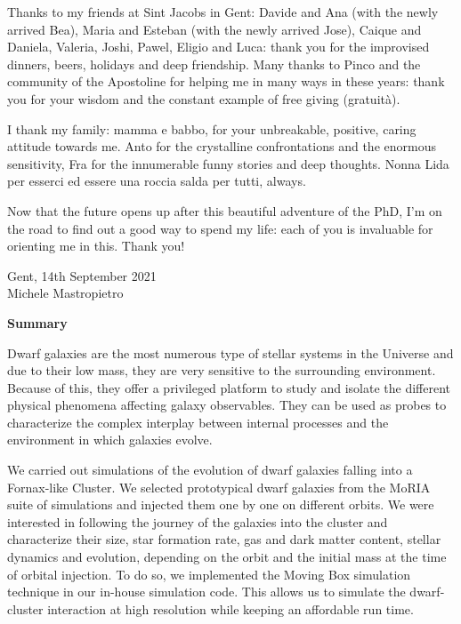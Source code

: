 Thanks to my friends at Sint Jacobs in Gent: Davide and Ana (with the newly arrived Bea), Maria and Esteban (with the newly arrived Jose), Caique and Daniela, Valeria, Joshi, Pawel, Eligio and Luca: thank you for the improvised dinners, beers, holidays and deep friendship.
Many thanks to Pinco and the community of the Apostoline for helping me in many ways in these years: thank you for your wisdom and the constant example of free giving (gratuità).

I thank my family: mamma e babbo, for your unbreakable, positive, caring attitude towards me.
Anto for the crystalline confrontations and the enormous sensitivity, Fra for the innumerable funny stories and deep thoughts. Nonna Lida per esserci ed essere una roccia salda per tutti, always.

Now that the future opens up after this beautiful adventure of the PhD, I'm on the road to find out a good way to spend my life: each of you is invaluable for orienting me in this. Thank you!

\begin{flushright}
  Gent, 14th September 2021\\Michele Mastropietro
\end{flushright}

\clearpage
\thispagestyle{empty}
\null%
\label{thesis:Summary}
\begin{center}
  {\Large \textbf{Summary}}\\
\end{center}

Dwarf galaxies are the most numerous type of stellar systems in the Universe and due to their low mass, they are very sensitive to the surrounding environment.
Because of this, they offer a privileged platform to study and isolate the different physical phenomena affecting galaxy observables.
They can be used as probes to characterize the complex interplay between internal processes and the environment in which galaxies evolve.

We carried out simulations of the evolution of dwarf galaxies falling into a Fornax-like Cluster.
We selected prototypical dwarf galaxies from the MoRIA suite of simulations and injected them one by one on different orbits.
We were interested in following the journey of the galaxies into the cluster and characterize their size, star formation rate, gas and dark matter content, stellar dynamics and evolution, depending on the orbit and the initial mass at the time of orbital injection.
To do so, we implemented the Moving Box simulation technique in our in-house simulation code.
This allows us to simulate the dwarf-cluster interaction at high resolution while keeping an affordable run time.

